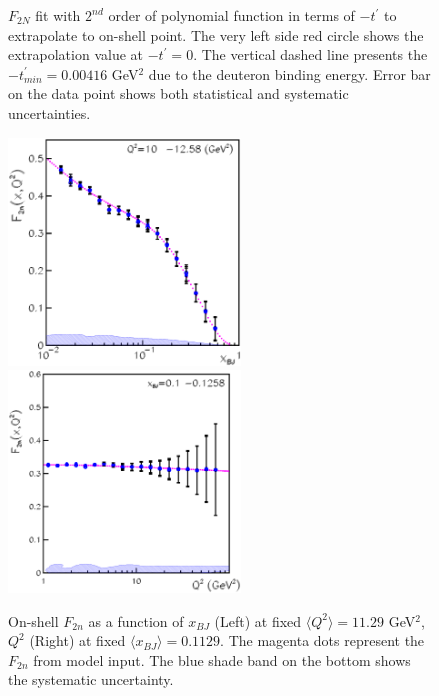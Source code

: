 \documentclass[12pt,letterpaper]{article}
\begin{document}
\begin{figure}[htb]
  \begin{center} 
    \caption{$F_{2N}$ fit with $2^{nd}$ order of polynomial function in terms of $-t^{\prime}$ to extrapolate to on-shell point. The very left side red circle shows the extrapolation value at $-t^{\prime}=0$. The vertical dashed line presents the $-t^{\prime}_{min}= 0.00416$ GeV$^2$ due to the deuteron binding energy. Error bar on the data point shows both statistical and systematic uncertainties.
      \label{fig:F2NExtra}
    }
  \end{center} 
\end{figure}



\begin{figure}[htb]
  \hspace{-6mm}
  \includegraphics[width=0.55\textwidth]{./LDRD2015/q2_11p29_extrapolated_f2n_vs_xbj_with_syserr2.ps}
  \includegraphics[width=0.55\textwidth]{./LDRD2015/xbj_0p1129_extrapolated_f2n_vs_q2_with_syserr2.ps}
  \caption[On-shell $F_{2n}$]{On-shell $F_{2n}$ as a function of $x_{BJ}$ (Left) at fixed $\langle Q^2 \rangle =11.29$ GeV$^2$, $Q^2$ (Right) at fixed $\langle x_{BJ} \rangle =0.1129$. The magenta dots represent the $F_{2n}$ from model input. The blue shade band on the bottom shows the systematic uncertainty. \label{fig:F2NExtra2}}
\end{figure}
\end{document}
